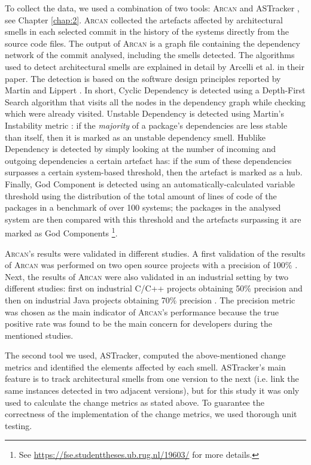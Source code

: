 To collect the data, we used a combination of two tools: \textsc{Arcan} \cite{Arcelli2016} and ASTracker , see Chapter \ref{chap:2}. \textsc{Arcan} collected the artefacts affected by architectural smells in each selected commit in the history of the systems directly from the source code files.
The output of \textsc{Arcan} is a graph file containing the dependency network of the commit analysed, including the smells detected.
The algorithms used to detect architectural smells are explained in detail by Arcelli et al. in their paper\cite{Arcelli2016}. The detection is based on the software design principles reported by Martin \cite{Martin2018} and Lippert \cite{Lippert2006}.
In short, Cyclic Dependency is detected using a Depth-First Search algorithm that visits all the nodes in the dependency graph while checking which were already visited. 
Unstable Dependency is detected using Martin's Instability metric \cite{Martin2018}: if the \emph{majority} of a package's  dependencies are less stable than itself, then it is marked as an unstable dependency smell.
Hublike Dependency is detected by simply looking at the number of incoming and outgoing dependencies a certain artefact has: if the sum of these dependencies surpasses a certain system-based threshold, then the artefact is marked as a hub.
Finally, God Component is detected using an automatically-calculated variable threshold \cite{Arcelli2015} using the distribution of the total amount of lines of code of the packages in a benchmark of over 100 systems; the packages in the analysed system are then compared with this threshold and the artefacts surpassing it are marked as God Components \footnote{See \url{https://fse.studenttheses.ub.rug.nl/19603/} for more details.}.

\textsc{Arcan}'s results were validated in different studies. A first validation of the results of \textsc{Arcan} was performed on two open source projects with a precision of 100\% \cite{Arcelli2016}. 
Next, the results of \textsc{Arcan} were also validated in an industrial setting by two different studies: first on industrial C/C++ projects obtaining 50\% precision \cite{Martini2018} and then on industrial Java projects obtaining 70\% precision \cite{Arcelli2020}.
The precision metric was chosen as the main indicator of \textsc{Arcan}'s performance because the true positive rate was found to be the main concern for developers during the mentioned studies.

The second tool we used, ASTracker, computed the above-mentioned change metrics and identified the elements affected by each smell.
ASTracker's main feature is to track architectural smells from one version to the next (i.e. link the same instances detected in two adjacent versions), but for this study it was only used to calculate the change metrics as stated above. To guarantee the correctness of the implementation of the change metrics, we used thorough unit testing.

